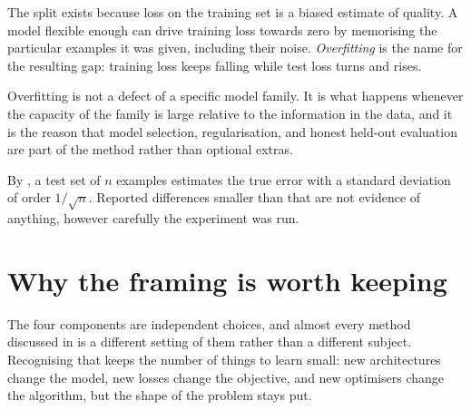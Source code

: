 
The split exists because loss on the training set is a biased estimate of
quality. A model flexible enough can drive training loss towards zero by
memorising the particular examples it was given, including their noise.
\emph{Overfitting} is the name for the resulting gap: training loss keeps
falling while test loss turns and rises.

\begin{remark}
Overfitting is not a defect of a specific model family. It is what happens
whenever the capacity of the family is large relative to the information in the
data, and it is the reason that model selection, regularisation, and honest
held-out evaluation are part of the method rather than optional extras.
\end{remark}

By , a test set of \(n\) examples estimates the true error with a
standard deviation of order \(1/\sqrt n\). Reported differences smaller than that
are not evidence of anything, however carefully the experiment was run.

\section{Why the framing is worth keeping}

The four components are independent choices, and almost every method discussed
in  is a different setting of them rather than a
different subject. Recognising that keeps the number of things to learn small:
new architectures change the model, new losses change the objective, and new
optimisers change the algorithm, but the shape of the problem stays put.
